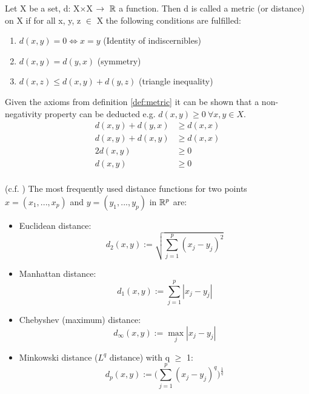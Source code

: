 \begin{definition}\label{def:metric} Let X be a set, d: X$\times$X $\rightarrow~\mathbb{R}$ a function. Then d is called a metric (or distance) on X if for all x, y, z $\in$ X the following conditions are fulfilled: 
\begin{enumerate}[label=(\subscript{D}{\arabic*})]
	\item\label{itm:namee} $d(x,y) = 0 \Leftrightarrow x = y$ \hfill (Identity of indiscernibles)
	\item $d(x,y) = d(y,x)$  \hfill (symmetry)
	\item $d(x,z) \leq d(x,y) + d(y,z)$ \hfill (triangle inequality)
\end{enumerate}

\begin{remark}
	Given the axioms from definition \ref{def:metric} it can be shown that a non-negativity property can be deducted e.g. $d(x,y) \geq 0 ~\forall x,y \in X$.
	\begin{equation*}
	\begin{split}
		d(x,y) + d(y,x) & \geq d(x,x) \\
		d(x,y) + d(x,y) & \geq d(x,x) \\
		2d(x,y)         & \geq 0      \\
		d(x,y)          & \geq 0      \\
	\end{split}
	\end{equation*}
\end{remark}


\begin{example}(c.f. \cite{analysis_1}) The most frequently used distance functions for two points $x=(x_1, ..., x_p)$ and  $y=(y_1, ..., y_p)$ in $\mathbb{R}^p$ are: 
	\begin{itemize}[label=$\star$]
		\item Euclidean distance:
			\begin{equation*}
				d_2(x,y) := \sqrt{\sum_{j=1}^p(x_j - y_j)^2}
			\end{equation*}
		\item Manhattan distance:
			\begin{equation*}
				d_1(x,y) := \sum_{j=1}^p|x_j - y_j|
			\end{equation*}
		\item Chebyshev (maximum) distance:
			\begin{equation*}
				d_\infty(x,y) := \max_j|x_j - y_j|
			\end{equation*}		
		\item Minkowski distance ($L^q$ distance) with q $\geq$ 1:
			\begin{equation*}
				d_p(x,y) := \bigg(\sum_{j=1}^p(x_j - y_j)^q\bigg)^{\frac{1}{q}}
			\end{equation*}	
	\end{itemize}
\end{example}

\end{definition}
